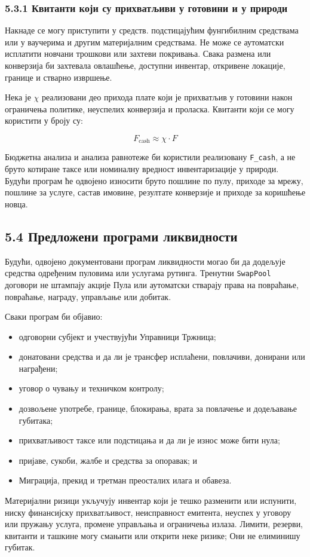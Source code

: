 \documentclass[11pt]{article}
\begin{document}
\subsubsection*{5.3.1 Квитанти који су прихватљиви у готовини и у природи}

Накнаде се могу приступити у средств. подстицајућим фунгибилним средствама или у ваучерима и другим материјалним средствама. Не може се аутоматски исплатити новчани трошкови или захтеви покривања. Свака размена или конверзија би захтевала овлашћење, доступни инвентар, откривене локације, границе и стварно извршење.

Нека је \texttt{$\chi$} реализовани део прихода плате који је прихватљив у готовини након ограничења политике, неуспелих конверзија и проласка. Квитанти који се могу користити у броју су:

\[
F_{\mathrm{cash}} \approx \chi \cdot F
\]

Бюджетна анализа и анализа равнотеже би користили реализовану \texttt{F\_cash}, а не бруто котиране таксе или номиналну вредност инвентаризације у природи. Будући програм ће одвојено износити бруто пошлине по пулу, приходе за мрежу, пошлине за услуге, састав имовине, резултате конверзије и приходе за коришћење новца.

\subsection*{5.4 Предложени програми ликвидности}

Будући, одвојено документовани програм ликвидности могао би да додељује средства одређеним пуловима или услугама рутинга. Тренутни \texttt{SwapPool} договори не штампају акције Пула или аутоматски стварају права на повраћање, повраћање, награду, управљање или добитак.

Сваки програм би објавио:

\begin{itemize}[leftmargin=*]
\item одговорни субјект и учествујући Управници Тржница;
\item донатовани средства и да ли је трансфер исплаћени, повлачиви, донирани или награђени;
\item уговор о чувању и техничком контролу;
\item дозвољене употребе, границе, блокирања, врата за повлачење и додељавање губитака;
\item прихватљивост таксе или подстицања и да ли је износ може бити нула;
\item пријаве, сукоби, жалбе и средства за опоравак; и
\item Миграција, прекид и третман преосталих илага и обавеза.
\end{itemize}
Материјални ризици укључују инвентар који је тешко разменити или испунити, ниску финансијску прихватљивост, неисправност емитента, неуспех у уговору или пружању услуга, промене управљања и ограничења излаза. Лимити, резерви, квитанти и ташкине могу смањити или открити неке ризике; Они не елиминишу губитак.
\end{document}
